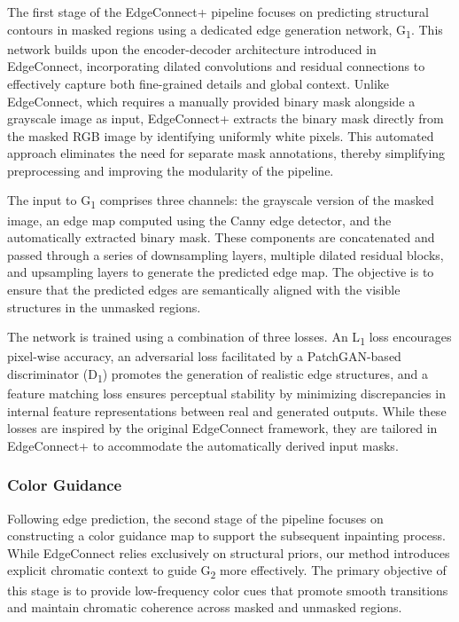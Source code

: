 The first stage of the EdgeConnect+ pipeline focuses on predicting structural contours in masked regions using a dedicated edge generation network, G\textsubscript{1}. This network builds upon the encoder-decoder architecture introduced in EdgeConnect, incorporating dilated convolutions and residual connections to effectively capture both fine-grained details and global context. Unlike EdgeConnect, which requires a manually provided binary mask alongside a grayscale image as input, EdgeConnect+ extracts the binary mask directly from the masked RGB image by identifying uniformly white pixels. This automated approach eliminates the need for separate mask annotations, thereby simplifying preprocessing and improving the modularity of the pipeline.

The input to G\textsubscript{1} comprises three channels: the grayscale version of the masked image, an edge map computed using the Canny edge detector, and the automatically extracted binary mask. These components are concatenated and passed through a series of downsampling layers, multiple dilated residual blocks, and upsampling layers to generate the predicted edge map. The objective is to ensure that the predicted edges are semantically aligned with the visible structures in the unmasked regions.

The network is trained using a combination of three losses. An L\textsubscript{1} loss encourages pixel-wise accuracy, an adversarial loss facilitated by a PatchGAN-based discriminator (D\textsubscript{1}) promotes the generation of realistic edge structures, and a feature matching loss ensures perceptual stability by minimizing discrepancies in internal feature representations between real and generated outputs. While these losses are inspired by the original EdgeConnect framework, they are tailored in EdgeConnect+ to accommodate the automatically derived input masks.


\subsubsection{Color Guidance}

Following edge prediction, the second stage of the pipeline focuses on constructing a color guidance map to support the subsequent inpainting process. While EdgeConnect relies exclusively on structural priors, our method introduces explicit chromatic context to guide G\textsubscript{2} more effectively. The primary objective of this stage is to provide low-frequency color cues that promote smooth transitions and maintain chromatic coherence across masked and unmasked regions.

